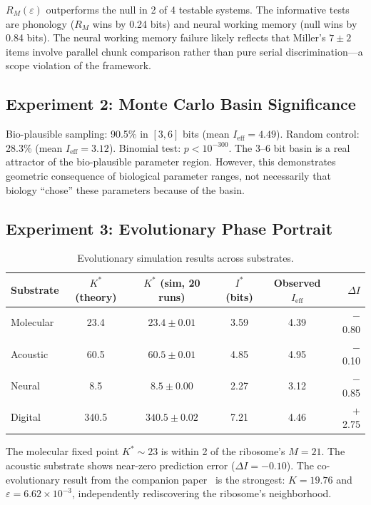 \documentclass[12pt,a4paper]{article}
\begin{document}
$R_M(\varepsilon)$ outperforms the null in 2 of 4 testable systems. The informative tests are phonology ($R_M$ wins by 0.24 bits) and neural working memory (null wins by 0.84 bits). The neural working memory failure likely reflects that Miller's $7 \pm 2$ items involve parallel chunk comparison rather than pure serial discrimination---a scope violation of the framework.

\subsection{Experiment 2: Monte Carlo Basin Significance}

Bio-plausible sampling: 90.5\% in $[3, 6]$ bits (mean $I_{\mathrm{eff}} = 4.49$). Random control: 28.3\% (mean $I_{\mathrm{eff}} = 3.12$). Binomial test: $p < 10^{-300}$. The 3--6 bit basin is a real attractor of the bio-plausible parameter region. However, this demonstrates geometric consequence of biological parameter ranges, not necessarily that biology ``chose'' these parameters because of the basin.

\subsection{Experiment 3: Evolutionary Phase Portrait}

\begin{table}[ht]
\centering
\caption{Evolutionary simulation results across substrates.}
\begin{tabular}{lccccr}
\toprule
Substrate & $K^*$ (theory) & $K^*$ (sim, 20 runs) & $I^*$ (bits) & Observed $I_{\mathrm{eff}}$ & $\Delta I$ \\
\midrule
Molecular & 23.4 & $23.4 \pm 0.01$ & 3.59 & 4.39 & $-$0.80 \\
Acoustic & 60.5 & $60.5 \pm 0.01$ & 4.85 & 4.95 & $-$0.10 \\
Neural & 8.5 & $8.5 \pm 0.00$ & 2.27 & 3.12 & $-$0.85 \\
Digital & 340.5 & $340.5 \pm 0.02$ & 7.21 & 4.46 & $+$2.75 \\
\bottomrule
\end{tabular}
\label{tab:evolution}
\end{table}

The molecular fixed point $K^* \sim 23$ is within 2 of the ribosome's $M = 21$. The acoustic substrate shows near-zero prediction error ($\Delta I = -0.10$). The co-evolutionary result from the companion paper~\cite{whitmer2026basin} is the strongest: $K = 19.76$ and $\varepsilon = 6.62 \times 10^{-3}$, independently rediscovering the ribosome's neighborhood.
\end{document}
